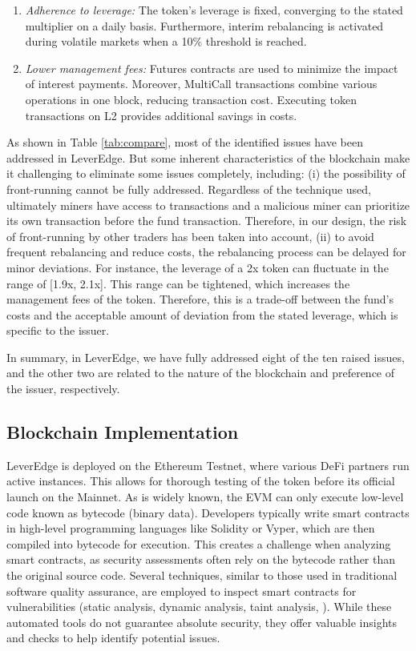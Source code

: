 \begin{enumerate}[label={\ref{sec:proposal}.\arabic*},leftmargin=*]
	\item \textit{Adherence to leverage:} The token's leverage is fixed, converging to the stated multiplier on a daily basis. Furthermore, interim rebalancing is activated during volatile markets when a 10\% threshold is reached.
	
	\item \textit{Lower management fees:} Futures contracts are used to minimize the impact of interest payments. Moreover, MultiCall transactions combine various operations in one block, reducing transaction cost. Executing token transactions on L2 provides additional savings in costs.
\end{enumerate}

As shown in Table \ref{tab:compare}, most of the identified issues have been addressed in LeverEdge. But some inherent characteristics of the blockchain make it challenging to eliminate some issues completely, including: (i) the possibility of front-running cannot be fully addressed. Regardless of the technique used, ultimately miners have access to transactions and a malicious miner can prioritize its own transaction before the fund transaction. Therefore, in our design, the risk of front-running by other traders has been taken into account, (ii) to avoid frequent rebalancing and reduce costs, the rebalancing process can be delayed for minor deviations. For instance, the leverage of a 2x token can fluctuate in the range of [1.9x, 2.1x]. This range can be tightened, which increases the management fees of the token. Therefore, this is a trade-off between the fund's costs and the acceptable amount of deviation from the stated leverage, which is specific to the issuer.
	
In summary, in LeverEdge, we have fully addressed eight of the ten raised issues, and the other two are related to the nature of the blockchain and preference of the issuer, respectively.

\subsection{Blockchain Implementation}
LeverEdge is deployed on the Ethereum Testnet, where various DeFi partners run active instances. This allows for thorough testing of the token before its official launch on the Mainnet. As is widely known, the EVM can only execute low-level code known as bytecode (binary data). Developers typically write smart contracts in high-level programming languages like Solidity or Vyper, which are then compiled into bytecode for execution. This creates a challenge when analyzing smart contracts, as security assessments often rely on the bytecode rather than the original source code. Several techniques, similar to those used in traditional software quality assurance, are employed to inspect smart contracts for vulnerabilities (\eg static analysis, dynamic analysis, taint analysis, \etc). While these automated tools do not guarantee absolute security, they offer valuable insights and checks to help identify potential issues.

